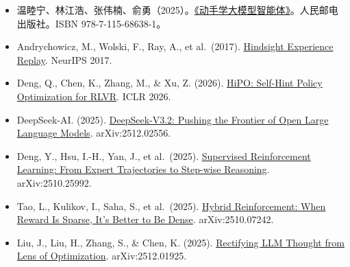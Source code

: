 \vspace{0.25em}
\begin{itemize}
\tightlist
\item
  温睦宁、林江浩、张伟楠、俞勇（2025）。\href{https://haa.boyuai.com/}{《动手学大模型智能体》}。人民邮电出版社。ISBN 978-7-115-68638-1。
\item
  Andrychowicz, M., Wolski, F., Ray, A., et al.~(2017). \href{https://arxiv.org/abs/1707.01495}{Hindsight Experience Replay}. NeurIPS 2017.
\item
  Deng, Q., Chen, K., Zhang, M., \& Xu, Z. (2026). \href{https://openreview.net/forum?id=rcb20pHmT1}{HiPO: Self-Hint Policy Optimization for RLVR}. ICLR 2026.
\item
  DeepSeek-AI. (2025). \href{https://arxiv.org/abs/2512.02556}{DeepSeek-V3.2: Pushing the Frontier of Open Large Language Models}. arXiv:2512.02556.
\item
  Deng, Y., Hsu, I.-H., Yan, J., et al.~(2025). \href{https://arxiv.org/abs/2510.25992}{Supervised Reinforcement Learning: From Expert Trajectories to Step-wise Reasoning}. arXiv:2510.25992.
\item
  Tao, L., Kulikov, I., Saha, S., et al.~(2025). \href{https://arxiv.org/abs/2510.07242}{Hybrid Reinforcement: When Reward Is Sparse, It's Better to Be Dense}. arXiv:2510.07242.
\item
  Liu, J., Liu, H., Zhang, S., \& Chen, K. (2025). \href{https://arxiv.org/abs/2512.01925}{Rectifying LLM Thought from Lens of Optimization}. arXiv:2512.01925.
\end{itemize}

\clearpage
